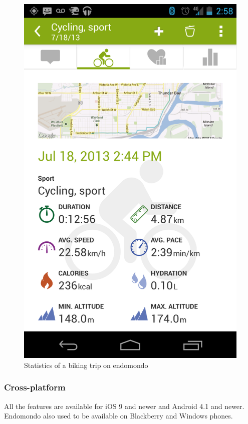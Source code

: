 \begin{figure}[h]
    \includegraphics[width=\textwidth]{Images/endomondo-bike-stats.png}
    \caption{Statistics of a biking trip on endomondo\cite{endomondo-bike-stats-img}}
\end{figure}

\subsubsection*{Cross-platform}
All the features are available for iOS 9 and newer and Android 4.1 and newer.
Endomondo also used to be available on Blackberry and Windows phones.
